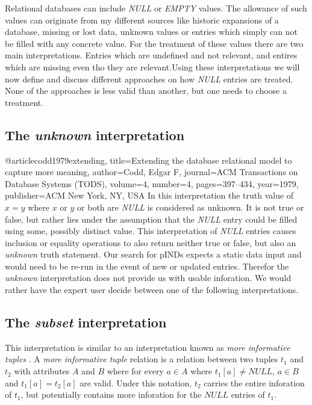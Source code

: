 
Relational databases can include \textit{NULL} or \textit{EMPTY} values.
The allowance of such values can originate from my different sources like historic expansions of a database, missing or lost data, unknown values or entries which simply can not be filled with any concrete value. For the treatment of these values there are two main interpretations. %
Entries which are undefined and not relevant, and entires which are missing even tho they are relevant.Using these interpretations we will now define and discuss different approaches on how \textit{NULL} entries are treated. None of the approaches is less valid than another, but one needs to choose a treatment.

\subsection*{The \textit{unknown} interpretation}
@article{codd1979extending,
  title={Extending the database relational model to capture more meaning},
  author={Codd, Edgar F},
  journal={ACM Transactions on Database Systems (TODS)},
  volume={4},
  number={4},
  pages={397--434},
  year={1979},
  publisher={ACM New York, NY, USA}
}
In this interpretation the truth value of $x = y$ where $x$ or $y$ or both are \textit{NULL} is considered as unknown.
It is not true or false, but rather lies under the assumption that the \textit{NULL} entry could be filled using some,
possibly distinct value. This interpretation of \textit{NULL} entries causes inclusion or equality operations to also
return neither true or false, but also an \textit{unknown} truth statement.
Our search for pINDs expects a static data input and would need to be re-run in the event of new or updated entries.
Therefor the \textit{unknown} interpretation does not provide us with usable inforation. We would rather have the
expert user decide between one of the following interpretations.

\subsection*{The \textit{subset} interpretation}
This interpretation is similar to an interpretation known as \textit{more informative tuples} \cite{zaniolo1982database}.
A \textit{more informative tuple} relation is a relation between two tuples $t_1$ and $t_2$ with attributes $A$ and $B$
where for every $a \in A$ where $t_1[a] \not = NULL$, $a \in B$ and $t_1[a] = t_2[a]$ are valid. Under this notation,
$t_2$ carries the entire inforation of $t_1$, but potentially contains more inforation for the $NULL$ entries of $t_1$.


